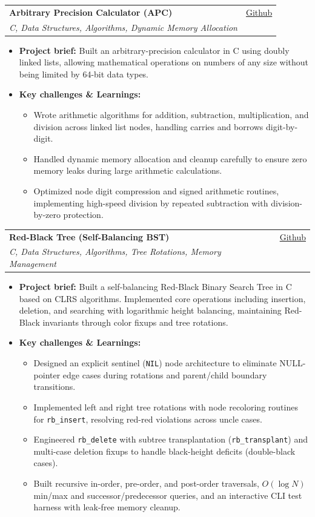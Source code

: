 \documentclass[letterpaper,11pt]{article}
\makeatletter
\newcommand{\resumeItem}[1]{
  \item
    {#1 \vspace{-3pt}}
}
\newcommand{\resumeSubheading}[4]{
  \vspace{-3pt}\item
    \begin{tabular*}{0.97\textwidth}[t]{l@{\extracolsep{\fill}}r}
      \textbf{#1} & #2 \\
      \textit{#3} & {#4} \\
    \end{tabular*}\vspace{-8pt}
}
\newcommand{\resumeItemListStart}{\begin{itemize}[topsep=1pt, itemsep=0.5pt, parsep=0pt]}
\newcommand{\resumeItemListEnd}{\end{itemize}\vspace{-6pt}}
\makeatother
\begin{document}
    \resumeSubheading
      {Arbitrary Precision Calculator (APC)}{\href{https://github.com/k0-R0/APC}{Github}}
      {C, Data Structures, Algorithms, Dynamic Memory Allocation}{}
      \resumeItemListStart
        \resumeItem{\textbf{Project brief:} Built an arbitrary-precision calculator in C using doubly linked lists, allowing mathematical operations on numbers of any size without being limited by 64-bit data types.}
        \resumeItem{\textbf{Key challenges \& Learnings:}}
        \resumeItemListStart
            \resumeItem{Wrote arithmetic algorithms for addition, subtraction, multiplication, and division across linked list nodes, handling carries and borrows digit-by-digit.}
            \resumeItem{Handled dynamic memory allocation and cleanup carefully to ensure zero memory leaks during large arithmetic calculations.}
            \resumeItem{Optimized node digit compression and signed arithmetic routines, implementing high-speed division by repeated subtraction with division-by-zero protection.}
        \resumeItemListEnd
      \resumeItemListEnd

    \resumeSubheading
      {Red-Black Tree (Self-Balancing BST)}{\href{https://github.com/k0-R0/RedBlack_Tree}{Github}}
      {C, Data Structures, Algorithms, Tree Rotations, Memory Management}{}
      \resumeItemListStart
        \resumeItem{\textbf{Project brief:} Built a self-balancing Red-Black Binary Search Tree in C based on CLRS algorithms. Implemented core operations including insertion, deletion, and searching with logarithmic height balancing, maintaining Red-Black invariants through color fixups and tree rotations.}
        \resumeItem{\textbf{Key challenges \& Learnings:}}
        \resumeItemListStart
            \resumeItem{Designed an explicit sentinel (\texttt{NIL}) node architecture to eliminate NULL-pointer edge cases during rotations and parent/child boundary transitions.}
            \resumeItem{Implemented left and right tree rotations with node recoloring routines for \texttt{rb\_insert}, resolving red-red violations across uncle cases.}
            \resumeItem{Engineered \texttt{rb\_delete} with subtree transplantation (\texttt{rb\_transplant}) and multi-case deletion fixups to handle black-height deficits (double-black cases).}
            \resumeItem{Built recursive in-order, pre-order, and post-order traversals, $O(\log N)$ min/max and successor/predecessor queries, and an interactive CLI test harness with leak-free memory cleanup.}
        \resumeItemListEnd
      \resumeItemListEnd
\end{document}

